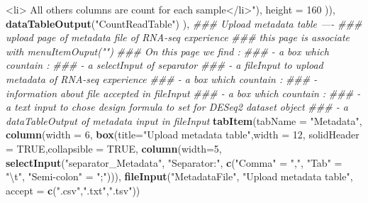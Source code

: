 \documentclass[
  12pt,
]{article}
\newenvironment{Shaded}{\begin{snugshade}}{\end{snugshade}}
\newcommand{\CharTok}[1]{\textcolor[rgb]{0.31,0.60,0.02}{#1}}
\newcommand{\CommentTok}[1]{\textcolor[rgb]{0.56,0.35,0.01}{\textit{#1}}}
\newcommand{\DataTypeTok}[1]{\textcolor[rgb]{0.13,0.29,0.53}{#1}}
\newcommand{\DecValTok}[1]{\textcolor[rgb]{0.00,0.00,0.81}{#1}}
\newcommand{\KeywordTok}[1]{\textcolor[rgb]{0.13,0.29,0.53}{\textbf{#1}}}
\newcommand{\NormalTok}[1]{#1}
\newcommand{\OtherTok}[1]{\textcolor[rgb]{0.56,0.35,0.01}{#1}}
\newcommand{\StringTok}[1]{\textcolor[rgb]{0.31,0.60,0.02}{#1}}
\begin{document}
\begin{Shaded}
\begin{Highlighting}[]
\StringTok{                               <li> All others columns are count for each sample</li>"}\NormalTok{),}
                             \DataTypeTok{height =} \DecValTok{160}
\NormalTok{                             )),}
                    \KeywordTok{dataTableOutput}\NormalTok{(}\StringTok{"CountReadTable"}\NormalTok{)}
\NormalTok{                    ),}
            \CommentTok{### Upload metadata table ----}
            \CommentTok{### upload page of metadata file of RNA-seq experience}
            \CommentTok{### this page is associate with menuItemOuput("")}
            \CommentTok{### On this page we find :}
            \CommentTok{###   - a box which countain :}
            \CommentTok{###       - a selectInput of separator }
            \CommentTok{###       - a fileInput to upload metadata of RNA-seq experience}
            \CommentTok{###   - a box which countain :}
            \CommentTok{###       - information about file accepted in fileInput}
            \CommentTok{###   - a box which countain :}
            \CommentTok{###       - a text input to chose design formula to set for DESeq2 dataset object}
            \CommentTok{###   - a dataTableOutput of metadata input in fileInput}
                  \KeywordTok{tabItem}\NormalTok{(}\DataTypeTok{tabName =} \StringTok{"Metadata"}\NormalTok{,}
                    \KeywordTok{column}\NormalTok{(}\DataTypeTok{width =} \DecValTok{6}\NormalTok{,}
                           \KeywordTok{box}\NormalTok{(}\DataTypeTok{title=}\StringTok{"Upload metadata table"}\NormalTok{,}\DataTypeTok{width =} \DecValTok{12}\NormalTok{, }\DataTypeTok{solidHeader =} \OtherTok{TRUE}\NormalTok{,}\DataTypeTok{collapsible =} \OtherTok{TRUE}\NormalTok{,}
                               \KeywordTok{column}\NormalTok{(}\DataTypeTok{width=}\DecValTok{5}\NormalTok{,}
                                      \KeywordTok{selectInput}\NormalTok{(}\StringTok{"separator_Metadata"}\NormalTok{, }\StringTok{"Separator:"}\NormalTok{, }
                                                  \KeywordTok{c}\NormalTok{(}\StringTok{"Comma"}\NormalTok{ =}\StringTok{ ","}\NormalTok{, }\StringTok{"Tab"}\NormalTok{ =}\StringTok{ "}\CharTok{\textbackslash{}t}\StringTok{"}\NormalTok{, }\StringTok{"Semi-colon"}\NormalTok{ =}\StringTok{ ";"}\NormalTok{))),}
                               \KeywordTok{fileInput}\NormalTok{(}\StringTok{"MetadataFile"}\NormalTok{, }\StringTok{"Upload metadata table"}\NormalTok{, }
                                         \DataTypeTok{accept =} \KeywordTok{c}\NormalTok{(}\StringTok{".csv"}\NormalTok{,}\StringTok{".txt"}\NormalTok{,}\StringTok{".tsv"}\NormalTok{))}

\end{Highlighting}
\end{Shaded}
\end{document}
